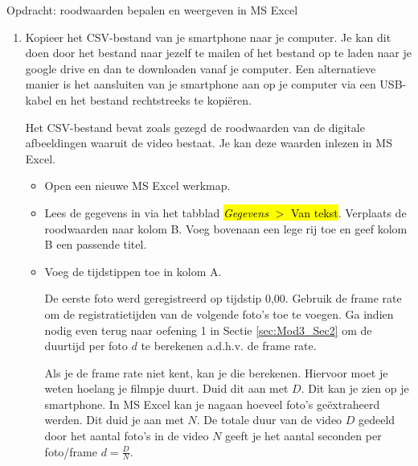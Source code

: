 \begin{opdracht}{Opdracht: roodwaarden bepalen en weergeven in MS Excel}
\begin{enumerate}
\begin{itemize}
			Het csv-bestand zou moeten opgeslaan worden op je smartphone in de map A\emph{ppInventor/data}.
			
			Ga na dat het CSV-bestand inderdaad op de voorziene plaats en onder de voorziene naam opgeslaan is op je smartphone. Je kan navigeren door de bestanden op je smartphone via de app \textquotedblleft Bestanden\textquotedblright, die normaal gezien standaard ge\"installeerd is op Android smartphones.
			
			
		\end{itemize}
	
	\item Kopieer het CSV-bestand van je smartphone naar je computer. Je kan dit doen door het bestand naar jezelf te mailen of het bestand op te laden naar je google drive en dan te downloaden vanaf je computer. Een alternatieve manier is het aansluiten van je smartphone aan op je computer via een USB-kabel en het bestand rechtstreeks te kopi\"eren. 
	
	Het CSV-bestand bevat zoals gezegd de roodwaarden van de digitale afbeeldingen waaruit de video bestaat. Je kan deze waarden inlezen in MS Excel. 
	
	\begin{itemize}
		\item Open een nieuwe MS Excel werkmap.
		\item Lees de gegevens in via het tabblad \hl{\emph{Gegevens} $>$ Van tekst}. Verplaats de roodwaarden naar kolom B. Voeg bovenaan een lege rij toe en geef kolom B een passende titel.
		\item Voeg de tijdstippen toe in kolom A. 
		
		De eerste foto werd geregistreerd op tijdstip 0,00. Gebruik de frame rate om de registratietijden van de volgende foto's toe te voegen. Ga indien nodig even terug naar oefening 1 in Sectie \ref{sec:Mod3_Sec2} om de duurtijd per foto $d$ te berekenen a.d.h.v. de frame rate.
		
		Als je de frame rate niet kent, kan je die berekenen. Hiervoor moet je weten hoelang je filmpje duurt. Duid dit aan met $D$. Dit kan je zien op je smartphone. In MS Excel kan je nagaan hoeveel foto's ge\"extraheerd werden. Dit duid je aan met $N$. De totale duur van de video $D$ gedeeld door het aantal foto's in de video $N$ geeft je het aantal seconden per foto/frame $d=\frac{D}{N}$. 
		

\end{itemize}
\end{enumerate}
\end{opdracht}
